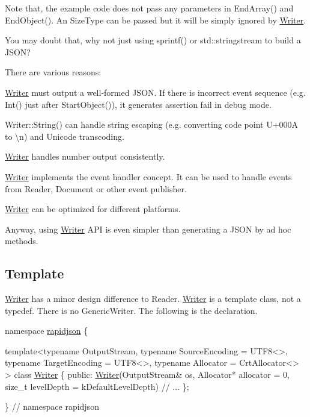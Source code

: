 Note that, the example code does not pass any parameters in {\ttfamily End\+Array()} and {\ttfamily End\+Object()}. An {\ttfamily Size\+Type} can be passed but it will be simply ignored by {\ttfamily \hyperlink{class_writer}{Writer}}.

You may doubt that, why not just using {\ttfamily sprintf()} or {\ttfamily std\+::stringstream} to build a J\+S\+ON?

There are various reasons\+:
\begin{DoxyEnumerate}
\item {\ttfamily \hyperlink{class_writer}{Writer}} must output a well-\/formed J\+S\+ON. If there is incorrect event sequence (e.\+g. {\ttfamily Int()} just after {\ttfamily Start\+Object()}), it generates assertion fail in debug mode.
\item {\ttfamily Writer\+::\+String()} can handle string escaping (e.\+g. converting code point {\ttfamily U+000A} to {\ttfamily \textbackslash{}n}) and Unicode transcoding.
\item {\ttfamily \hyperlink{class_writer}{Writer}} handles number output consistently.
\item {\ttfamily \hyperlink{class_writer}{Writer}} implements the event handler concept. It can be used to handle events from {\ttfamily Reader}, {\ttfamily Document} or other event publisher.
\item {\ttfamily \hyperlink{class_writer}{Writer}} can be optimized for different platforms.
\end{DoxyEnumerate}

Anyway, using {\ttfamily \hyperlink{class_writer}{Writer}} A\+PI is even simpler than generating a J\+S\+ON by ad hoc methods.\hypertarget{md_Cadriciel_Commun_Externe_RapidJSON_doc_sax.zh-cn_WriterTemplate}{}\subsection{Template}\label{md_Cadriciel_Commun_Externe_RapidJSON_doc_sax.zh-cn_WriterTemplate}
{\ttfamily \hyperlink{class_writer}{Writer}} has a minor design difference to {\ttfamily Reader}. {\ttfamily \hyperlink{class_writer}{Writer}} is a template class, not a typedef. There is no {\ttfamily Generic\+Writer}. The following is the declaration.


\begin{DoxyCode}
\textcolor{keyword}{namespace }\hyperlink{namespacerapidjson}{rapidjson} \{

\textcolor{keyword}{template}<\textcolor{keyword}{typename} OutputStream, \textcolor{keyword}{typename} SourceEncoding = UTF8<>, \textcolor{keyword}{typename} TargetEncoding = UTF8<>, \textcolor{keyword}{
      typename} Allocator = CrtAllocator<> >
\textcolor{keyword}{class }\hyperlink{class_writer}{Writer} \{
\textcolor{keyword}{public}:
    \hyperlink{class_writer}{Writer}(OutputStream& os, Allocator* allocator = 0, \textcolor{keywordtype}{size\_t} levelDepth = kDefaultLevelDepth)
\textcolor{comment}{// ...}
\};

\} \textcolor{comment}{// namespace rapidjson}
\end{DoxyCode}


